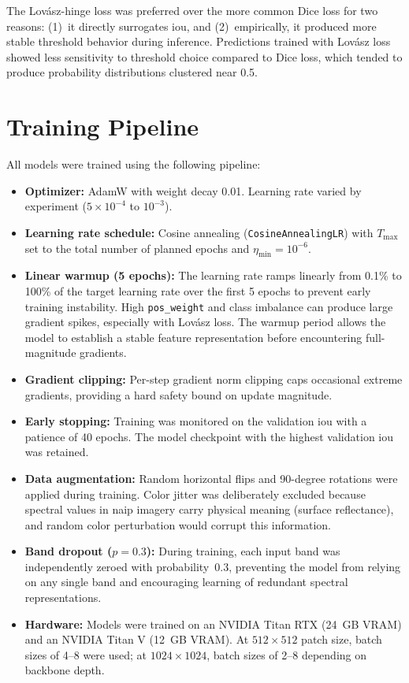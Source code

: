 The Lov\'{a}sz-hinge loss was preferred over the more common Dice loss for two reasons: (1)~it directly surrogates \acrshort{iou}, and (2)~empirically, it produced more stable threshold behavior during inference. Predictions trained with Lov\'{a}sz loss showed less sensitivity to threshold choice compared to Dice loss, which tended to produce probability distributions clustered near 0.5.

\section{Training Pipeline}
\label{sec:training}

All models were trained using the following pipeline:

\begin{itemize}
  \item \textbf{Optimizer:} AdamW with weight decay 0.01. Learning rate varied by experiment ($5 \times 10^{-4}$ to $10^{-3}$).
  \item \textbf{Learning rate schedule:} Cosine annealing (\texttt{CosineAnnealingLR}) with $T_{\max}$ set to the total number of planned epochs and $\eta_{\min} = 10^{-6}$.
  \item \textbf{Linear warmup (5 epochs):} The learning rate ramps linearly from 0.1\% to 100\% of the target learning rate over the first 5 epochs to prevent early training instability. High \texttt{pos\_weight} and class imbalance can produce large gradient spikes, especially with Lov\'{a}sz loss. The warmup period allows the model to establish a stable feature representation before encountering full-magnitude gradients.
  \item \textbf{Gradient clipping:} Per-step gradient norm clipping caps occasional extreme gradients, providing a hard safety bound on update magnitude.
  \item \textbf{Early stopping:} Training was monitored on the validation \acrshort{iou} with a patience of 40 epochs. The model checkpoint with the highest validation \acrshort{iou} was retained.
  \item \textbf{Data augmentation:} Random horizontal flips and 90-degree rotations were applied during training. Color jitter was deliberately excluded because spectral values in \acrshort{naip} imagery carry physical meaning (surface reflectance), and random color perturbation would corrupt this information.
  \item \textbf{Band dropout ($p = 0.3$):} During training, each input band was independently zeroed with probability~0.3, preventing the model from relying on any single band and encouraging learning of redundant spectral representations.
  \item \textbf{Hardware:} Models were trained on an NVIDIA Titan RTX (24~GB VRAM) and an NVIDIA Titan V (12~GB VRAM). At $512\times512$ patch size, batch sizes of 4--8 were used; at $1024\times1024$, batch sizes of 2--8 depending on backbone depth.
\end{itemize}

